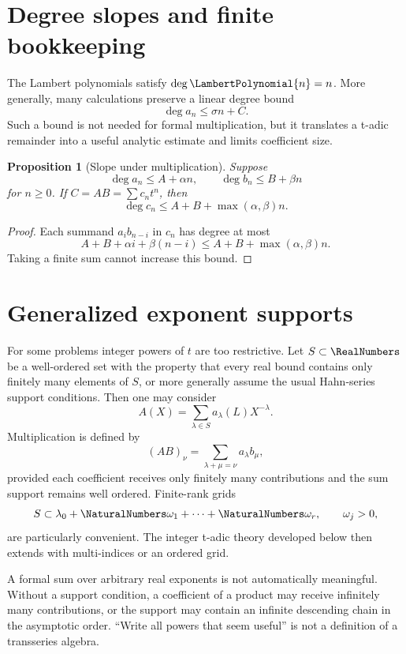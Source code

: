 \documentclass[11pt,openany]{book}
\theoremstyle{definition}
\theoremstyle{plain}
\newtheorem{proposition}{Proposition}[chapter]
\theoremstyle{remark}
\begin{document}
\section{Degree slopes and finite bookkeeping}
The Lambert polynomials satisfy \(\deg \LambertPolynomial{n}=n\).  More generally, many
calculations preserve a linear degree bound
\begin{equation}\label{eq:slope-bound}
 \deg a_n\le \sigma n+C.
\end{equation}
Such a bound is not needed for formal multiplication, but it translates a
t-adic remainder into a useful analytic estimate and limits coefficient size.

\begin{proposition}[Slope under multiplication]\label{prop:slope-product}
Suppose
\[
 \deg a_n\le A+\alpha n,
 \qquad
 \deg b_n\le B+\beta n
\]
for \(n\ge0\).  If \(C=AB=\sum c_nt^n\), then
\[
 \deg c_n\le A+B+\max(\alpha,\beta)n.
\]
\end{proposition}
\begin{proof}
Each summand \(a_i b_{n-i}\) in \(c_n\) has degree at most
\[
 A+B+\alpha i+\beta(n-i)
 \le A+B+\max(\alpha,\beta)n.
\]
Taking a finite sum cannot increase this bound.
\end{proof}

\section{Generalized exponent supports}
For some problems integer powers of \(t\) are too restrictive.  Let
\(S\subset\RealNumbers\) be a well-ordered set with the property that every real bound
contains only finitely many elements of \(S\), or more generally assume the
usual Hahn-series support conditions.  Then one may consider
\begin{equation}\label{eq:generalized-powerlog}
 A(X)=\sum_{\lambda\in S}a_\lambda(L)X^{-\lambda}.
\end{equation}
Multiplication is defined by
\[
 (AB)_\nu=\sum_{\lambda+\mu=\nu}a_\lambda b_\mu,
\]
provided each coefficient receives only finitely many contributions and the
sum support remains well ordered.  Finite-rank grids
\[
 S\subset\lambda_0+\NaturalNumbers\omega_1+\cdots+\NaturalNumbers\omega_r,
 \qquad \omega_j>0,
\]
are particularly convenient.  The integer t-adic theory developed below then
extends with multi-indices or an ordered grid.

\begin{warningbox}
A formal sum over arbitrary real exponents is not automatically meaningful.
Without a support condition, a coefficient of a product may receive infinitely
many contributions, or the support may contain an infinite descending chain in
the asymptotic order.  ``Write all powers that seem useful'' is not a
definition of a transseries algebra.
\end{warningbox}
\end{document}
